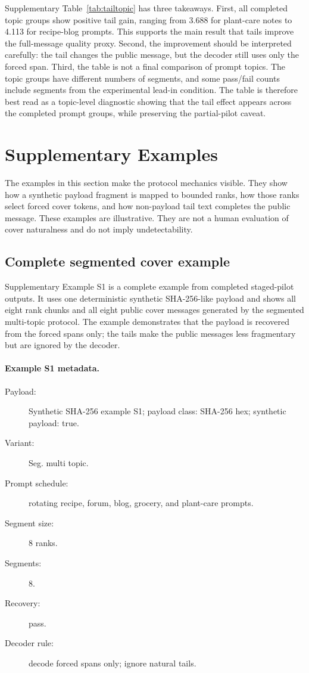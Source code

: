 \documentclass[fleqn,10pt]{wlscirep}
\begin{document}
Supplementary Table~\ref{tab:tailtopic} has three takeaways. First, all completed topic groups show positive tail gain, ranging from 3.688 for plant-care notes to 4.113 for recipe-blog prompts. This supports the main result that tails improve the full-message quality proxy. Second, the improvement should be interpreted carefully: the tail changes the public message, but the decoder still uses only the forced span. Third, the table is not a final comparison of prompt topics. The topic groups have different numbers of segments, and some pass/fail counts include segments from the experimental lead-in condition. The table is therefore best read as a topic-level diagnostic showing that the tail effect appears across the completed prompt groups, while preserving the partial-pilot caveat.

\section*{Supplementary Examples}

The examples in this section make the protocol mechanics visible. They show how a synthetic payload fragment is mapped to bounded ranks, how those ranks select forced cover tokens, and how non-payload tail text completes the public message. These examples are illustrative. They are not a human evaluation of cover naturalness and do not imply undetectability.

\subsection*{Complete segmented cover example}

Supplementary Example S1 is a complete example from completed staged-pilot outputs. It uses one deterministic synthetic SHA-256-like payload and shows all eight rank chunks and all eight public cover messages generated by the segmented multi-topic protocol. The example demonstrates that the payload is recovered from the forced spans only; the tails make the public messages less fragmentary but are ignored by the decoder.

\paragraph{Example S1 metadata.}
\begin{description}
\item[Payload:] Synthetic SHA-256 example S1; payload class: SHA-256 hex; synthetic payload: true.
\item[Variant:] Seg. multi topic.
\item[Prompt schedule:] rotating recipe, forum, blog, grocery, and plant-care prompts.
\item[Segment size:] 8 ranks.
\item[Segments:] 8.
\item[Recovery:] pass.
\item[Decoder rule:] decode forced spans only; ignore natural tails.
\end{description}
\end{document}
